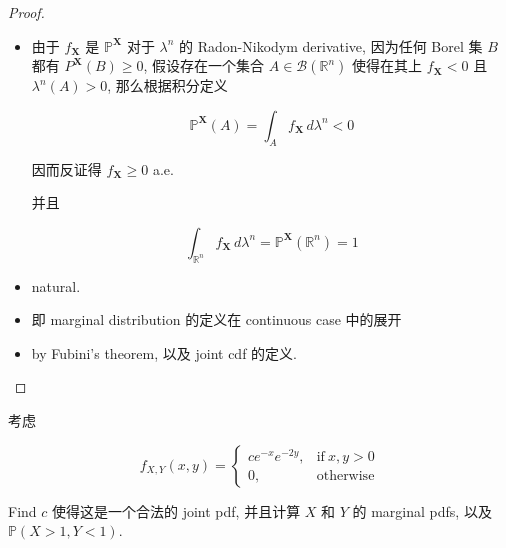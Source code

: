 \documentclass{qlnotes-export}
\begin{document}
\begin{proof}

\begin{itemize}
\item
  由于 \(f_{\mathbf{X}}\) 是 \({\mathbb{P}}^{\mathbf{X}}\) 对于 \(\lambda^{n}\) 的 Radon-Nikodym derivative, 因为任何 Borel 集 \(B\) 都有 \(P^{\mathbf{X}}(B) \geq 0\), 假设存在一个集合 \(A \in \mathcal{B}({\mathbb{R}}^{n})\) 使得在其上 \(f_{\mathbf{X}} < 0\) 且 \(\lambda^{n}(A) > 0\), 那么根据积分定义

  \[{\mathbb{P}}^{\mathbf{X}}(A) = \int_{A}f_{\mathbf{X}}\, d\lambda^{n} < 0\]

  因而反证得 \(f_{\mathbf{X}} \geq 0\) a.e.

  并且

  \[\int_{{\mathbb{R}}^{n}}f_{\mathbf{X}}\, d\lambda^{n} = {\mathbb{P}}^{\mathbf{X}}({\mathbb{R}}^{n}) = 1\]
\item
  natural.
\item
  即 marginal distribution 的定义在 continuous case 中的展开
\item
  by Fubini's theorem, 以及 joint cdf 的定义.
\end{itemize}

\end{proof}

\begin{example}

考虑

\[f_{X,Y}(x,y) = \left\{ \begin{matrix}
{ce^{- x}e^{- 2y},} & {\text{if}\ x,y > 0} \\
{0,} & \text{otherwise}
\end{matrix} \right.\]

Find \(c\) 使得这是一个合法的 joint pdf, 并且计算 \(X\) 和 \(Y\) 的 marginal pdfs, 以及 \({\mathbb{P}}(X > 1,Y < 1)\).

\end{example}
\end{document}
